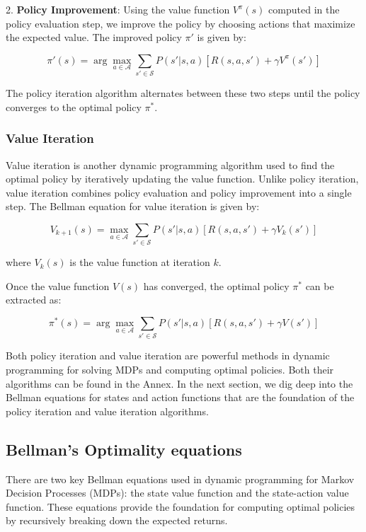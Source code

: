 2. \textbf{Policy Improvement}: Using the value function \(V^\pi(s)\) computed in the policy evaluation step, we improve the policy by choosing actions that maximize the expected value. The improved policy \(\pi'\) is given by:

\[
\pi'(s) = \arg\max_{a \in \mathcal{A}} \sum_{s' \in \mathcal{S}} P(s'|s, a) \left[ R(s, a, s') + \gamma V^\pi(s') \right]
\]

The policy iteration algorithm alternates between these two steps until the policy converges to the optimal policy \(\pi^*\).

\subsubsection{Value Iteration}

Value iteration is another dynamic programming algorithm used to find the optimal policy by iteratively updating the value function. Unlike policy iteration, value iteration combines policy evaluation and policy improvement into a single step. The Bellman equation for value iteration is given by:

\[
V_{k+1}(s) = \max_{a \in \mathcal{A}} \sum_{s' \in \mathcal{S}} P(s'|s, a) \left[ R(s, a, s') + \gamma V_k(s') \right]
\]

where \(V_k(s)\) is the value function at iteration \(k\).

Once the value function \(V(s)\) has converged, the optimal policy \(\pi^*\) can be extracted as:

\[
\pi^*(s) = \arg\max_{a \in \mathcal{A}} \sum_{s' \in \mathcal{S}} P(s'|s, a) \left[ R(s, a, s') + \gamma V(s') \right]
\]

Both policy iteration and value iteration are powerful methods in dynamic programming for solving MDPs and computing optimal policies. Both their algorithms can be found in the Annex. In the next section, we dig deep into the Bellman equations for states and action functions that are the foundation of the policy iteration and value iteration algorithms.




\subsection{Bellman's Optimality equations}
There are two key Bellman equations used in dynamic programming for Markov Decision Processes (MDPs): the state value function and the state-action value function. These equations provide the foundation for computing optimal policies by recursively breaking down the expected returns.


